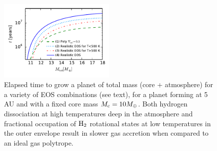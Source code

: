 

\begin{figure}[htb]
\centering
\includegraphics[width=0.5\textwidth]{figures/tplot.pdf}
\caption{Elapsed time to grow a planet of total mass (core + atmosphere) for a variety of EOS combinations (see text), for a planet forming at 5 AU and with a fixed core mass $M_{\rm c}=10 M_{\oplus}$. Both hydrogen dissociation at high temperatures deep in the atmosphere and fractional occupation of $\rm H_2$ rotational states at low temperatures in the outer envelope result in slower gas accretion when compared to an ideal gas polytrope.}
\label{fig:tplotall}
\end{figure}



